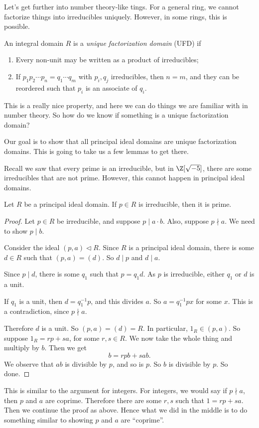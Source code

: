 \documentclass[a4paper]{article}
\begin{document}
Let's get further into number theory-like tings. For a general ring, we cannot factorize things into irreducibles uniquely. However, in some rings, this is possible.
\begin{defi}
  An integral domain $R$ is a \emph{unique factorization domain} (UFD) if
  \begin{enumerate}
    \item Every non-unit may be written as a product of irreducibles;
    \item If $p_1 p_2 \cdots p_n = q_1 \cdots q_m$ with $p_i, q_j$ irreducibles, then $n = m$, and they can be reordered such that $p_i$ is an associate of $q_i$.
  \end{enumerate}
\end{defi}
This is a really nice property, and here we can do things we are familiar with in number theory. So how do we know if something is a unique factorization domain?

Our goal is to show that all principal ideal domains are unique factorization domains. This is going to take us a few lemmas to get there.

Recall we saw that every prime is an irreducible, but in $\Z[\sqrt{-5}]$, there are some irreducibles that are not prime. However, this cannot happen in principal ideal domains.
\begin{lemma}
  Let $R$ be a principal ideal domain. If $p \in R$ is irreducible, then it is prime.
\end{lemma}

\begin{proof}
  Let $p \in R$ be irreducible, and suppose $p \mid a\cdot b$. Also, suppose $p \nmid a$. We need to show $p \mid b$.

  Consider the ideal $(p, a) \lhd R$. Since $R$ is a principal ideal domain, there is some $d \in R$ such that $(p, a) = (d)$. So $d \mid p$ and $d \mid a$.

  Since $p \mid d$, there is some $q_1$ such that $p = q_1 d$. As $p$ is irreducible, either $q_1$ or $d$ is a unit.

  If $q_1$ is a unit, then $d = q_1^{-1} p$, and this divides $a$. So $a = q_1^{-1} p x$ for some $x$. This is a contradiction, since $p\nmid a$.

  Therefore $d$ is a unit. So $(p, a) = (d) = R$. In particular, $1_R \in (p, a)$. So suppose $1_R = rp + sa$, for some $r, s \in R$. We now take the whole thing and multiply by $b$. Then we get
  \[
    b = rpb + sab.
  \]
  We observe that $ab$ is divisible by $p$, and so is $p$. So $b$ is divisible by $p$. So done.
\end{proof}
This is similar to the argument for integers. For integers, we would say if $p \nmid a$, then $p$ and $a$ are coprime. Therefore there are some $r, s$ such that $1 = rp + sa$. Then we continue the proof as above. Hence what we did in the middle is to do something similar to showing $p$ and $a$ are ``coprime''.
\end{document}
